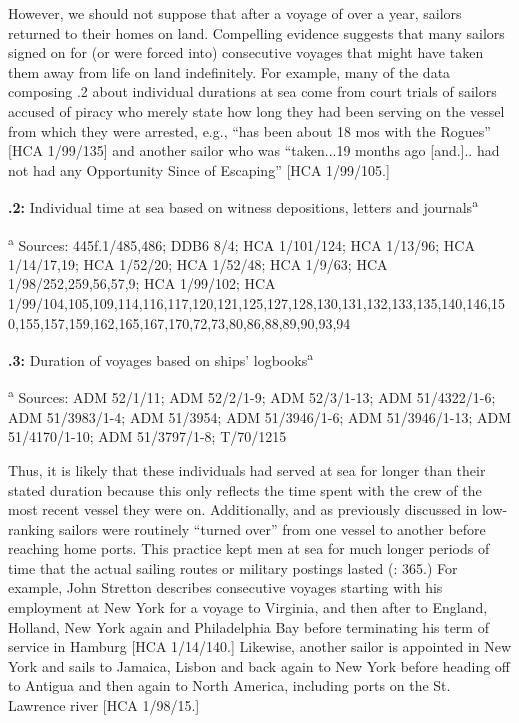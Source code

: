 However, we should not suppose that after a voyage of over a year, sailors returned to their homes on land. Compelling evidence suggests that many sailors signed on for (or were forced into) consecutive voyages that might have taken them away from life on land indefinitely. For example, many of the data composing .2 about individual durations at sea come from court trials of sailors accused of piracy who merely state how long they had been serving on the vessel from which they were arrested, e.g., “has been about 18 mos with the Rogues” [HCA 1/99/135] and another sailor who was “taken...19 months ago [and.].. had not had any Opportunity Since of Escaping” [HCA 1/99/105.]

  
 

\textbf{.2:} Individual time at sea based on witness depositions, letters and journals\textsuperscript{a} 

\textsuperscript{a} Sources: 445f.1/485,486; DDB6 8/4; HCA 1/101/124; HCA 1/13/96; HCA 1/14/17,19; HCA 1/52/20; HCA 1/52/48; HCA 1/9/63; HCA 1/98/252,259,56,57,9; HCA 1/99/102; HCA 1/99/104,105,109,114,116,117,120,121,125,127,128,130,131,132,133,135,140,146,150,155,157,159,162,165,167,170,72,73,80,86,88,89,90,93,94

  
 

\textbf{.3:} Duration of voyages based on ships’ logbooks\textsuperscript{a}

\textsuperscript{a} Sources: ADM 52/1/11; ADM 52/2/1-9; ADM 52/3/1-13; ADM 51/4322/1-6; ADM 51/3983/1-4; ADM 51/3954; ADM 51/3946/1-6; ADM 51/3946/1-13; ADM 51/4170/1-10; ADM 51/3797/1-8; T/70/1215

Thus, it is likely that these individuals had served at sea for longer than their stated duration because this only reflects the time spent with the crew of the most recent vessel they were on. Additionally, and as previously discussed in  low-ranking sailors were routinely “turned over” from one vessel to another before reaching home ports. This practice kept men at sea for much longer periods of time that the actual sailing routes or military postings lasted (\citealt{AdkinsAdkins2008}: 365.) For example, John Stretton describes consecutive voyages starting with his employment at New York for a voyage to Virginia, and then after to England, Holland, New York again and Philadelphia Bay before terminating his term of service in Hamburg [HCA 1/14/140.] Likewise, another sailor is appointed in New York and sails to Jamaica, Lisbon and back again to New York before heading off to Antigua and then again to North America, including ports on the St. Lawrence river [HCA 1/98/15.] 

